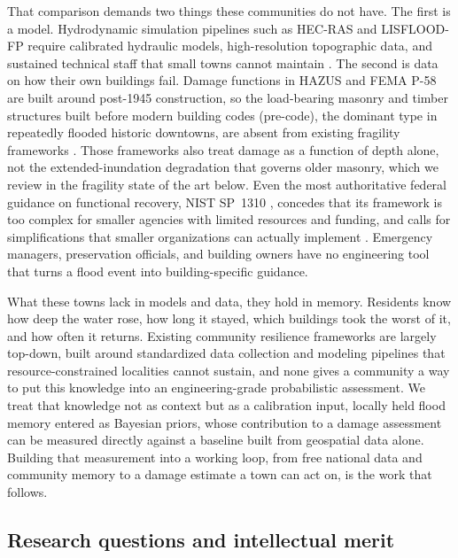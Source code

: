 \documentclass[11pt]{article}
\begin{document}
That comparison demands two things these communities do not have.
The first is a model.
Hydrodynamic simulation pipelines such as HEC-RAS and LISFLOOD-FP require calibrated
hydraulic models, high-resolution topographic data, and sustained technical staff
that small towns cannot maintain \cite{usace2024hecras,bates2000lisflood,fewtrell2011benchmarking}.
The second is data on how their own buildings fail.
Damage functions in HAZUS and FEMA P-58 are built around post-1945 construction, so
the load-bearing masonry and timber structures built before modern building codes
(pre-code), the dominant type in repeatedly flooded historic downtowns, are absent
from existing fragility frameworks \cite{fema2025hazus,fema2018p58}.
Those frameworks also treat damage as a function of depth alone, not the
extended-inundation degradation that governs older masonry, which we review in the
fragility state of the art below.
Even the most authoritative federal guidance on functional recovery, NIST SP~1310
\cite{davis2024nist}, concedes that its framework is too complex for smaller agencies
with limited resources and funding, and calls for simplifications that smaller
organizations can actually implement \cite[Sec.~6.1.3]{davis2024nist}.
Emergency managers, preservation officials, and building owners have no engineering
tool that turns a flood event into building-specific guidance.

What these towns lack in models and data, they hold in memory.
Residents know how deep the water rose, how long it stayed, which buildings took the
worst of it, and how often it returns.
Existing community resilience frameworks are largely top-down, built around
standardized data collection and modeling pipelines that resource-constrained
localities cannot sustain, and none gives a community a way to put this knowledge
into an engineering-grade probabilistic assessment.
We treat that knowledge not as context but as a calibration input, locally held flood
memory entered as Bayesian priors, whose contribution to a damage assessment can be
measured directly against a baseline built from geospatial data alone.
Building that measurement into a working loop, from free national data and community
memory to a damage estimate a town can act on, is the work that follows.

\vspace{-10pt}
\subsection{Research questions and intellectual merit}
\end{document}
